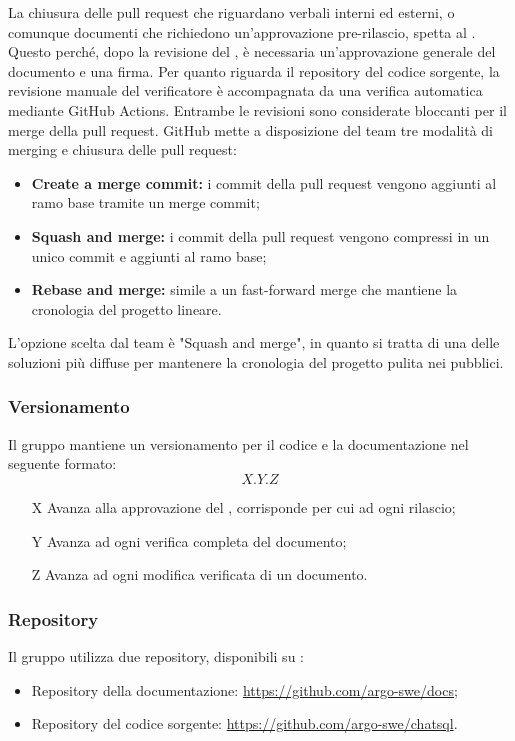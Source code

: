 \par La chiusura delle pull request che riguardano verbali interni ed esterni, o comunque documenti che richiedono un'approvazione pre-rilascio, spetta al \Responsabile{}. Questo perché, dopo la revisione del \Verificatore{}, è necessaria un'approvazione generale del documento e una firma. Per quanto riguarda il repository del codice sorgente, la revisione manuale del verificatore è accompagnata da una verifica automatica mediante GitHub Actions. Entrambe le revisioni sono considerate bloccanti per il merge della pull request. GitHub mette a disposizione del team tre modalità di merging e chiusura delle pull request:
\begin{itemize}
  \item \textbf{Create a merge commit:} i commit della pull request vengono aggiunti al ramo base tramite un merge commit;
  \item \textbf{Squash and merge:} i commit della pull request vengono compressi in un unico commit e aggiunti al ramo base;
  \item \textbf{Rebase and merge:} simile a un fast-forward merge che mantiene la cronologia del progetto lineare.
\end{itemize}
\par L'opzione scelta dal team è "Squash and merge", in quanto si tratta di una delle soluzioni più diffuse per mantenere la cronologia del progetto pulita nei  pubblici.

\subsubsection{Versionamento}
Il gruppo mantiene un versionamento per il codice e la documentazione nel seguente formato:
\[ X.Y.Z \]
\begin{itemize}
  \item[X] Avanza alla approvazione del \Responsabile{}, corrisponde per cui ad ogni rilascio;
  \item[Y] Avanza ad ogni verifica completa del documento;
  \item[Z] Avanza ad ogni modifica verificata di un documento.
\end{itemize}

\subsubsection{Repository}
Il gruppo utilizza due repository, disponibili su :
\begin{itemize}
  \item Repository della documentazione: \href{https://github.com/argo-swe/docs}{https://github.com/argo-swe/docs};
  \item Repository del codice sorgente: \href{https://github.com/argo-swe/chatsql}{https://github.com/argo-swe/chatsql}.
\end{itemize}


